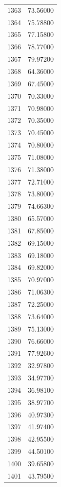 \documentclass[
  letterpaper,
  DIV=11,
  numbers=noendperiod]{scrreprt}
\begin{document}
\begin{tcolorbox}
\begin{tabular}{lr}
1363 &         73.56000 \\
1364 &         75.78800 \\
1365 &         77.15800 \\
1366 &         78.77000 \\
1367 &         79.97200 \\
1368 &         64.36000 \\
1369 &         67.45000 \\
1370 &         70.33000 \\
1371 &         70.98000 \\
1372 &         70.35000 \\
1373 &         70.45000 \\
1374 &         70.80000 \\
1375 &         71.08000 \\
1376 &         71.38000 \\
1377 &         72.71000 \\
1378 &         73.80000 \\
1379 &         74.66300 \\
1380 &         65.57000 \\
1381 &         67.85000 \\
1382 &         69.15000 \\
1383 &         69.18000 \\
1384 &         69.82000 \\
1385 &         70.97000 \\
1386 &         71.06300 \\
1387 &         72.25000 \\
1388 &         73.64000 \\
1389 &         75.13000 \\
1390 &         76.66000 \\
1391 &         77.92600 \\
1392 &         32.97800 \\
1393 &         34.97700 \\
1394 &         36.98100 \\
1395 &         38.97700 \\
1396 &         40.97300 \\
1397 &         41.97400 \\
1398 &         42.95500 \\
1399 &         44.50100 \\
1400 &         39.65800 \\
1401 &         43.79500 \\

\end{tabular}
\end{tcolorbox}
\end{document}
